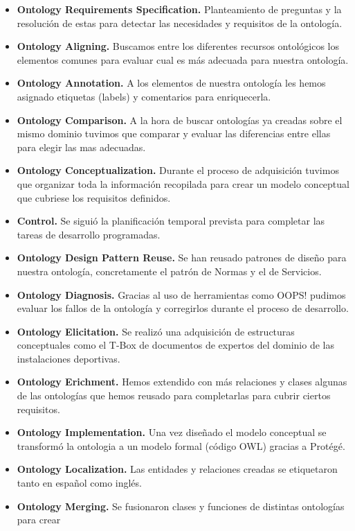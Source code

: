 \documentclass[a4paper,12pt]{article}
\begin{document}
	\begin{itemize}
		\item \textbf{Ontology Requirements Specification.} Planteamiento de preguntas y la resolución de
estas para detectar las necesidades y requisitos de la ontología.
		\item \textbf{Ontology Aligning.} Buscamos entre los diferentes recursos ontológicos los elementos comunes para evaluar cual es más adecuada para nuestra ontología.
		\item \textbf{Ontology Annotation.} A los elementos de nuestra ontología les hemos asignado etiquetas
(labels) y comentarios para enriquecerla.
		\item \textbf{Ontology Comparison.} A la hora de buscar ontologías ya creadas sobre el mismo dominio
tuvimos que comparar y evaluar las diferencias entre ellas para elegir las mas adecuadas.
		\item \textbf{Ontology Conceptualization.} Durante el proceso de adquisición tuvimos que organizar
toda la información recopilada para crear un modelo conceptual que cubriese los
requisitos definidos.
		\item \textbf{Control.} Se siguió la planificación temporal prevista para completar las tareas de
desarrollo programadas.
		\item \textbf{Ontology Design Pattern Reuse.} Se han reusado patrones de diseño para nuestra
ontología, concretamente el patrón de Normas y el de Servicios.
		\item \textbf{Ontology Diagnosis.} Gracias al uso de herramientas como OOPS! pudimos evaluar los
fallos de la ontología y corregirlos durante el proceso de desarrollo.
		\item \textbf{Ontology Elicitation.} Se realizó una adquisición de estructuras conceptuales como el T-Box de documentos de expertos del dominio de las instalaciones deportivas.
		\item \textbf{Ontology Erichment.} Hemos extendido con más relaciones y clases algunas de las
ontologías que hemos reusado para completarlas para cubrir ciertos requisitos.
		\item \textbf{Ontology Implementation.} Una vez diseñado el modelo conceptual se transformó la ontologia a un modelo formal (código OWL) gracias a Protégé.
		\item \textbf{Ontology Localization.} Las entidades y relaciones creadas se etiquetaron tanto en español
como inglés.
		\item \textbf{Ontology Merging.} Se fusionaron clases y funciones de distintas ontologías para crear

\end{itemize}
\end{document}

